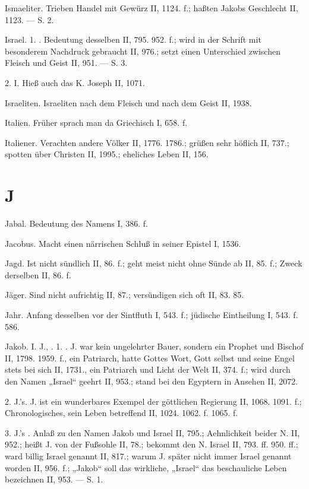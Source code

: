 Ismaeliter. Trieben Handel mit Gewürz II, 1124. f.; haßten Jakobs Geschlecht II, 1123. — S.  2.

Israel. 1. . Bedeutung desselben II, 795. 952. f.; wird in der Schrift mit besonderem Nachdruck gebraucht II, 976.; setzt einen Unterschied zwischen Fleisch und Geist II, 951. — S.  3.

2.  I. Hieß auch das K. Joseph II, 1071.

Israeliten. Israeliten nach dem Fleisch und nach dem Geist II, 1938.

Italien. Früher sprach man da Griechisch I, 658. f.

Italiener. Verachten andere Völker II, 1776. 1786.; grüßen sehr höflich II, 737.; spotten über Christen II, 1995.; eheliches Leben II, 156.

\section{J}

Jabal. Bedeutung des Namens I, 386. f.

Jacobus. Macht einen närrischen Schluß in seiner Epistel I, 1536.

Jagd. Ist nicht sündlich II, 86. f.; geht meist nicht ohne Sünde ab II, 85. f.; Zweck derselben II, 86. f.

Jäger. Sind nicht aufrichtig II, 87.; versündigen sich oft II, 83. 85.

Jahr. Anfang desselben vor der Sintfluth I, 543. f.; jüdische Eintheilung I, 543. f. 586.

Jakob. I. J., . 1. . J. war kein ungelehrter Bauer, sondern ein Prophet und Bischof II, 1798. 1959. f., ein Patriarch, hatte Gottes Wort, Gott selbst und seine Engel stets bei sich II, 1731., ein Patriarch und Licht der Welt II, 374. f.; wird durch den Namen „Israel“ geehrt II, 953.; stand bei den Egyptern in Ansehen II, 2072.

2.  J.’s. J. ist ein wunderbares Exempel der göttlichen Regierung II, 1068. 1091. f.; Chronologisches, sein Leben betreffend II, 1024. 1062. f. 1065. f.

3. J.’s . Anlaß zu den Namen Jakob und Israel II, 795.; Aehnlichkeit beider N. II, 952.; heißt J. von der Fußsohle II, 78.; bekommt den N. Israel II, 793. ff. 950. ff.; ward billig Israel genannt II, 817.; warum J. später nicht immer Israel genannt worden II, 956. f.; „Jakob“ soll das wirkliche, „Israel“ das beschauliche Leben bezeichnen II, 953. — S.  1.

